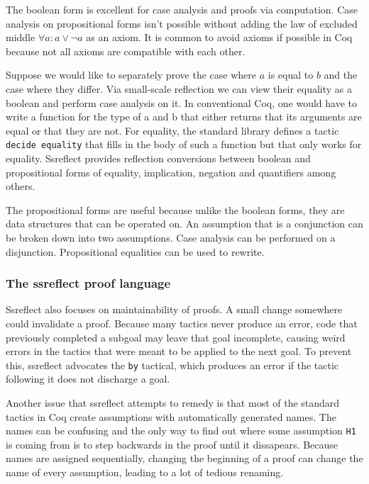 \documentclass[english, 12pt, a4paper, sci, a-1b, online]{aaltothesis}
\newcommand\icoq[1]{\texttt{#1}}
\begin{document}
The boolean form is excellent for case analysis and proofs via computation. Case analysis on propositional forms isn't possible without adding the law of excluded middle $\forall a : a \lor \lnot a$ as an axiom. It is common to avoid axioms if possible in Coq because not all axioms are compatible with each other.

Suppose we would like to separately prove the case where $a$ is equal to $b$ and the case where they differ. Via small-scale reflection we can view their equality as a boolean and perform case analysis on it. In conventional Coq, one would have to write a function for the type of a and b that either returns that its arguments are equal or that they are not. For equality, the standard library defines a tactic \icoq{decide equality} that fills in the body of such a function but that only works for equality. Ssreflect provides reflection conversions between boolean and propositional forms of equality, implication, negation and quantifiers among others.

The propositional forms are useful because unlike the boolean forms, they are data structures that can be operated on. An assumption that is a conjunction can be broken down into two assumptions. Case analysis can be performed on a disjunction. Propositional equalities can be used to rewrite.

\subsubsection{The ssreflect proof language}

Ssreflect also focuses on maintainability of proofs. A small change somewhere could invalidate a proof. Because many tactics never produce an error, code that previously completed a subgoal may leave that goal incomplete, causing weird errors in the tactics that were meant to be applied to the next goal. To prevent this, ssreflect advocates the \icoq{by} tactical, which produces an error if the tactic following it does not discharge a goal.

Another issue that ssreflect attempts to remedy is that most of the standard tactics in Coq create assumptions with automatically generated names. The names can be confusing and the only way to find out where some assumption \icoq{H1} is coming from is to step backwards in the proof until it dissapears. Because names are assigned sequentially, changing the beginning of a proof can change the name of every assumption, leading to a lot of tedious renaming.
\end{document}

